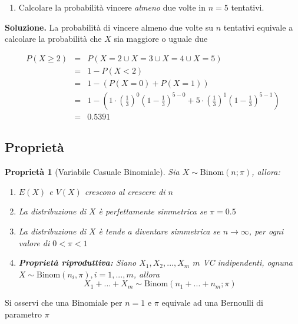 \documentclass[
  11pt,
]{book}
\providecommand{\tightlist}{%
  \setlength{\itemsep}{0pt}\setlength{\parskip}{0pt}}
\theoremstyle{mytheoremstyle}
\newtheorem{proposition}{Proprietà}[section]
\theoremstyle{mydefstyle}
\begin{document}
\begin{enumerate}
\def\labelenumi{\arabic{enumi}.}
\setcounter{enumi}{2}
\tightlist
\item
  Calcolare la probabilità vincere \emph{almeno} due volte in \(n=5\) tentativi.
\end{enumerate}

\textbf{Soluzione.}
La probabilità di vincere almeno due volte su \(n\) tentativi equivale a calcolare la probabilità che \(X\) sia maggiore o uguale due

\begin{eqnarray*}
P(X\geq 2) &=& P(X=2 \cup X=3 \cup X=4 \cup X=5)\\
           &=& 1-P(X<2)\\
           &=& 1-(P(X=0)+P(X=1))\\
           &=& 1-\left(1\cdot \left(\frac 1 3\right)^0\left(1-\frac 1 3\right)^{5-0} +5\cdot \left(\frac 1 3\right)^1\left(1-\frac 1 3\right)^{5-1} \right)\\
           &=& 0.5391
\end{eqnarray*}

\subsection{Proprietà}\label{proprietuxe0}

\begin{proposition}[Variabile Casuale Binomiale]

Sia \(X\sim\text{Binom}(n;\pi)\), allora:

\begin{enumerate}
\def\labelenumi{\arabic{enumi}.}
\tightlist
\item
  \(E(X)\) e \(V(X)\) crescono al crescere di \(n\)
\item
  La distribuzione di \(X\) è perfettamente simmetrica se \(\pi=0.5\)
\item
  La distribuzione di \(X\) è tende a diventare simmetrica se \(n\to\infty\), per ogni valore di \(0<\pi<1\)
\item
  \textbf{Proprietà riproduttiva:}
  Siano \(X_1,X_2,...,X_m\) \(m\) VC indipendenti, ognuna \(X\sim\text{Binom}(n_i,\pi), i =1,...,m\), allora
  \[X_1+...+X_m\sim\text{Binom}(n_1+...+n_m;\pi)\]
\end{enumerate}

\end{proposition}

Si osservi che una Binomiale per \(n=1\) e \(\pi\) equivale ad una Bernoulli di
parametro \(\pi\)
\end{document}
